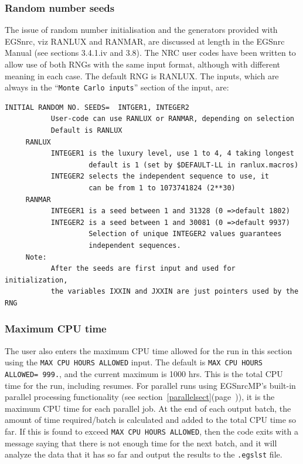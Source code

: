 \documentclass[12pt,twoside]{article}  %
\newcommand{\lpage}[1]{(page~\pageref{#1})}
\begin{document}
\subsubsection{Random number seeds}
\label{rngsect}
The issue of random number initialisation and the generators provided with
EGSnrc, viz RANLUX and RANMAR, are discussed at length in the EGSnrc
Manual\cite{KR00} (see sections 3.4.1.iv and 3.8).  The NRC user codes have
been written to allow use of both RNGs with the same input format, although
with different meaning in each case. The default RNG is RANLUX.  The
inputs, which are always in the ``{\tt Monte Carlo inputs}'' section of the
input, are:
\begin{verbatim}
INITIAL RANDOM NO. SEEDS=  INTGER1, INTEGER2
           User-code can use RANLUX or RANMAR, depending on selection
           Default is RANLUX
     RANLUX
           INTEGER1 is the luxury level, use 1 to 4, 4 taking longest
                    default is 1 (set by $DEFAULT-LL in ranlux.macros)
           INTEGER2 selects the independent sequence to use, it
                    can be from 1 to 1073741824 (2**30)
     RANMAR
           INTEGER1 is a seed between 1 and 31328 (0 =>default 1802)
           INTEGER2 is a seed between 1 and 30081 (0 =>default 9937)
                    Selection of unique INTEGER2 values guarantees
                    independent sequences.
     Note:
           After the seeds are first input and used for initialization,
           the variables IXXIN and JXXIN are just pointers used by the RNG
\end{verbatim}

\subsubsection{Maximum CPU time}
\label{cpusect}
The user also enters the maximum CPU time allowed for the run in
this section using the {\tt MAX CPU HOURS ALLOWED} input.
The default is {\tt MAX CPU HOURS ALLOWED= 999.}, and the
current maximum is 1000 hrs.  This is the total CPU time for the run,
including resumes.  For parallel runs using EGSnrcMP's built-in
parallel processing functionality
(see section~\ref{parallelsect}\lpage{parallelsect}), it is the maximum
CPU time for each parallel job.  At the end of each output batch, the amount
of time required/batch is calculated and added to the total CPU time
so far.  If this is found to exceed {\tt MAX CPU HOURS ALLOWED},
then the code exits with a message saying that there is not enough time
for the next batch, and it will analyze the data that it has so far and
output the results to the {\tt .egslst} file.
\end{document}
